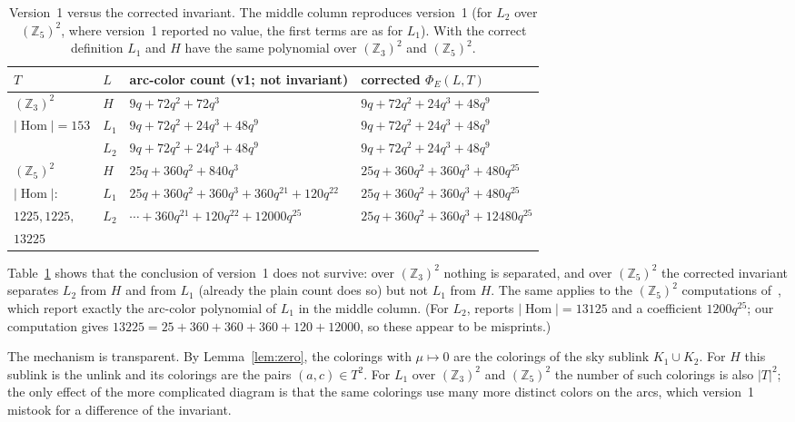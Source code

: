 \documentclass[11pt]{article}
\theoremstyle{definition}
\newcommand{\Z}{\mathbb{Z}}
\newcommand{\Hom}{\operatorname{Hom}}
\newcommand{\PhiE}{\Phi_E}
\begin{document}
\begin{table}[h]
\centering\footnotesize
\begin{tabular}{@{}llll@{}}
\toprule
$T$ & $L$ & arc-color count (v1; not invariant) & corrected $\PhiE(L,T)$ \\
\midrule
$(\Z_3)^2$ & $H$   & $9q+72q^2+72q^3$ & $9q+72q^2+24q^3+48q^9$ \\
$|\Hom|=153$ & $L_1$ & $9q+72q^2+24q^3+48q^9$ & $9q+72q^2+24q^3+48q^9$ \\
           & $L_2$ & $9q+72q^2+24q^3+48q^9$ & $9q+72q^2+24q^3+48q^9$ \\
\midrule
$(\Z_5)^2$ & $H$ & $25q+360q^2+840q^3$ & $25q+360q^2+360q^3+480q^{25}$ \\
$|\Hom|$: & $L_1$ & $25q+360q^2+360q^3+360q^{21}+120q^{22}$ & $25q+360q^2+360q^3+480q^{25}$ \\
$1225,1225,$ & $L_2$ & $\cdots+360q^{21}+120q^{22}+12000q^{25}$ & $25q+360q^2+360q^3+12480q^{25}$ \\
$13225$ & & & \\
\bottomrule
\end{tabular}
\caption{Version~1 versus the corrected invariant. The middle column reproduces version~1 (for $L_2$
over $(\Z_5)^2$, where version~1 reported no value, the first terms are as for $L_1$). With the correct
definition $L_1$ and $H$ have the same polynomial over $(\Z_3)^2$ and $(\Z_5)^2$.}
\label{tab:v1}
\end{table}

Table~\ref{tab:v1} shows that the conclusion of version~1 does not survive: over $(\Z_3)^2$ nothing is
separated, and over $(\Z_5)^2$ the corrected invariant separates $L_2$ from $H$ and from $L_1$ (already
the plain count does so) but not $L_1$ from $H$. The same applies to the $(\Z_5)^2$ computations
of~\cite{Jai24}, which report exactly the arc-color polynomial of $L_1$ in the middle column. (For $L_2$,
\cite{Jai24} reports $|\Hom|=13125$ and a coefficient $1200q^{25}$; our computation gives
$13225=25+360+360+360+120+12000$, so these appear to be misprints.)

The mechanism is transparent. By Lemma~\ref{lem:zero}, the colorings with $\mu\mapsto0$ are the
colorings of the sky sublink $K_1\cup K_2$. For $H$ this sublink is the unlink and its colorings are the
pairs $(a,c)\in T^2$. For $L_1$ over $(\Z_3)^2$ and $(\Z_5)^2$ the number of such colorings is also
$|T|^2$; the only effect of the more complicated diagram is that the same colorings use many more
distinct colors on the arcs, which version~1 mistook for a difference of the invariant.
\end{document}
